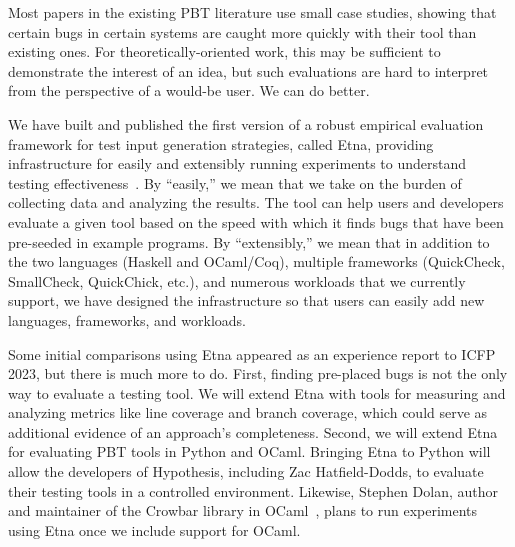 

%
%
%
Most papers in the existing PBT literature use small case studies,
showing that certain bugs in certain systems
are caught more quickly with their tool than existing ones. For
theoretically-oriented work, this may be sufficient
to demonstrate the interest of an idea, but such evaluations
are hard to interpret from the perspective of a would-be user.
We can do better.

We have built and published the first version of a robust empirical evaluation
framework for
test input generation strategies, called Etna, providing infrastructure
for easily and extensibly running experiments to understand testing
effectiveness~\cite{shi2023etna}.  By ``easily,'' we mean that we take on the burden of
collecting data and analyzing the results.  The tool
can help users and developers evaluate a given tool based on
the
speed with which it finds bugs that have been pre-seeded in example programs. By
``extensibly,'' we mean that in addition to the two languages (Haskell and
OCaml/Coq), multiple frameworks (QuickCheck, SmallCheck, QuickChick, etc.), and
numerous workloads that we currently support, we have designed the
infrastructure so that users can easily add new
languages, frameworks, and workloads.

Some initial comparisons using Etna appeared as an experience report to ICFP
2023, but there is much more to do. First, finding pre-placed bugs is not the
only way to evaluate a testing tool. We will extend Etna with
tools for measuring and analyzing metrics like line coverage and branch
coverage, which could serve as additional evidence of an approach's
completeness. Second, we will extend Etna for evaluating PBT
tools in Python and OCaml. Bringing Etna to Python will
allow the developers of Hypothesis, including Zac Hatfield-Dodds, to evaluate their testing tools in a controlled
environment. Likewise, Stephen Dolan, author and maintainer of
the Crowbar library in OCaml~\cite{dolan2017testing}, plans to run experiments using Etna once
we include support for OCaml.

